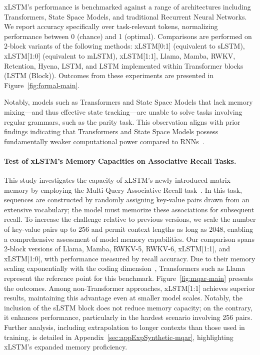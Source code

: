 xLSTM’s performance is benchmarked against a range of architectures including Transformers, State Space Models, and traditional Recurrent Neural Networks. We report accuracy specifically over task-relevant tokens, normalizing performance between 0 (chance) and 1 (optimal). Comparisons are performed on 2-block variants of the following methods: xLSTM[0:1] (equivalent to sLSTM), xLSTM[1:0] (equivalent to mLSTM), xLSTM[1:1], Llama, Mamba, RWKV, Retention, Hyena, LSTM, and LSTM implemented within Transformer blocks (LSTM (Block)). Outcomes from these experiments are presented in Figure~\ref{fig:formal-main}.

Notably, models such as Transformers and State Space Models that lack memory mixing—and thus effective state tracking—are unable to solve tasks involving regular grammars, such as the parity task. This observation aligns with prior findings indicating that Transformers and State Space Models possess fundamentally weaker computational power compared to RNNs~\citep{Merrill:24, Merrill:23, Deletang:23}.

\paragraph{Test of xLSTM's Memory Capacities on Associative Recall Tasks.} This study investigates the capacity of xLSTM's newly introduced matrix memory by employing the Multi-Query Associative Recall task~\citep{Arora:23arxiv}. In this task, sequences are constructed by randomly assigning key-value pairs drawn from an extensive vocabulary; the model must memorize these associations for subsequent recall. To increase the challenge relative to previous versions, we scale the number of key-value pairs up to 256 and permit context lengths as long as 2048, enabling a comprehensive assessment of model memory capabilities. Our comparison spans 2-block versions of Llama, Mamba, RWKV-5, RWKV-6, xLSTM[1:1], and xLSTM[1:0], with performance measured by recall accuracy. Due to their memory scaling exponentially with the coding dimension~\citep{Ramsauer:21}, Transformers such as Llama represent the reference point for this benchmark. Figure~\ref{fig:mqar-main} presents the outcomes. Among non-Transformer approaches, xLSTM[1:1] achieves superior results, maintaining this advantage even at smaller model scales. Notably, the inclusion of the sLSTM block does not reduce memory capacity; on the contrary, it enhances performance, particularly in the hardest scenario involving 256 pairs. Further analysis, including extrapolation to longer contexts than those used in training, is detailed in Appendix~\ref{sec:appExpSynthetic-mqar}, highlighting xLSTM's expanded memory proficiency.


